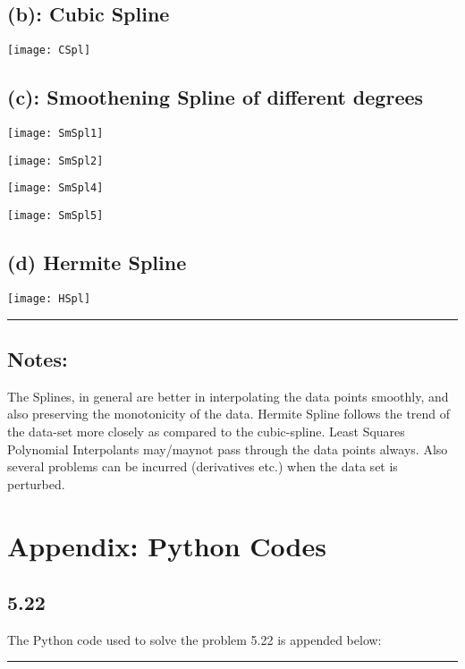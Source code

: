 \subsection*{(b): Cubic Spline}
\begin{center}
\texttt{[image: CSpl]}
\end{center}
\newpage\subsection*{(c): Smoothening Spline of different degrees}
\begin{center}
\texttt{[image: SmSpl1]}
\end{center}
\begin{center}
\texttt{[image: SmSpl2]}
\end{center}\begin{center}
\texttt{[image: SmSpl4]}
\end{center}\begin{center}
\texttt{[image: SmSpl5]}
\end{center}
\newpage\subsection*{(d) Hermite Spline}
\begin{center}
\texttt{[image: HSpl]}
\end{center}\hrule
\subsection*{Notes: }
The Splines, in general are better in interpolating the data points smoothly, and also preserving the monotonicity of the data. Hermite Spline follows the trend of the data-set more closely as compared to the cubic-spline. Least Squares Polynomial Interpolants may/maynot pass through the data points always. Also several problems can be incurred (derivatives etc.) when the data set is perturbed.  
\newpage\section*{Appendix: Python Codes}
\subsection*{5.22}
The Python code used to solve the problem 5.22 is appended below: 
\hrule

